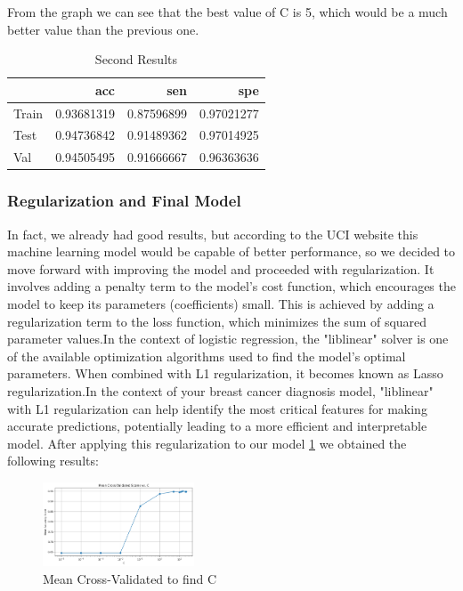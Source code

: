 \documentclass[12pt,a4paper,twocolumn]{article}
\begin{document}
From the graph we can see that the best value of C is 5, which would be a much better value than the previous one.


\begin{table}[h!]
\begin{tabular}{lrrr}
\toprule
{} &       acc &       sen &       spe \\
\midrule
Train  &  0.93681319	 &  0.87596899 &  0.97021277 \\
Test &  0.94736842 &  0.91489362 &  0.97014925	 \\
Val   &  0.94505495 &  0.91666667 &  0.96363636 \\
\bottomrule
\end{tabular}
    \caption{Second Results}
    \label{tab:results_1}
\end{table}

\subsubsection{Regularization and Final Model}
In fact, we already had good results, but according to the UCI website\cite{misc_breast_cancer} this machine learning model would be capable of better performance, so we decided to move forward with improving the model and proceeded with regularization. It involves adding a penalty term to the model's cost function, which encourages the model to keep its parameters (coefficients) small. This is achieved by adding a regularization term to the loss function, which minimizes the sum of squared parameter values.In the context of logistic regression, the "liblinear" solver is one of the available optimization algorithms used to find the model's optimal parameters. When combined with L1 regularization, it becomes known as Lasso regularization.In the context of your breast cancer diagnosis model, "liblinear" with L1 regularization can help identify the most critical features for making accurate predictions, potentially leading to a more efficient and interpretable model.
After applying this regularization to our model \ref{fig:BestC} we obtained the following results:

\begin{figure}[H]

\includegraphics[width=0.4\textwidth]{images/learningCF.png}
\centering
\caption{\label{fig:BestC} Mean Cross-Validated to find C}
\end{figure}
\end{document}
